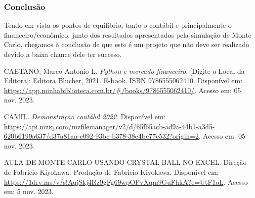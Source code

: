 \documentclass[11pt]{article}
\begin{document}
\subsubsection{\textbf{Conclusão}}
Tendo em vista os pontos de equilíbrio, tanto o contábil e principalmente o financeiro/econômico, junto dos resultados apresentados pela simulação de Monte Carlo, chegamos à conclusão de que este é um projeto que não deve ser realizado devido a baixa chance dele ter sucesso.

\newpage
\begin{thebibliography}{9}

CAETANO, Marco Antonio L. 
\textit{Python e mercado financeiro}. 
[Digite o Local da Editora]: Editora Blucher, 2021. E-book. ISBN 9786555062410. 
Disponível em: \href{https://app.minhabiblioteca.com.br/#/books/9786555062410/}{https://app.minhabiblioteca.com.br/#/books/9786555062410/}. 
Acesso em: 05 nov. 2023.

CAMIL. 
\textit{Demonstração contábil 2022}. 
Disponível em: \href{https://api.mziq.com/mzfilemanager/v2/d/65f65acb-ad9a-44b1-a3d5-620b6199a637/d37a81aa-c092-93bc-b378-38e4bc77c532?origin=2}{https://api.mziq.com/mzfilemanager/v2/d/65f65acb-ad9a-44b1-a3d5-620b6199a637/d37a81aa-c092-93bc-b378-38e4bc77c532?origin=2}. 
Acesso em: 05 nov. 2023.

AULA DE MONTE CARLO USANDO CRYSTAL BALL NO EXCEL. 
Direção de Fabricio Kiyokawa. Produção de Fabricio Kiyokawa.
Disponível em: \href{https://1drv.ms/v/s!AqjSkj4Rz9gFg69wpOPvXqm9GuFhkA?e=UtF1oL}{https://1drv.ms/v/s!AqjSkj4Rz9gFg69wpOPvXqm9GuFhkA?e=UtF1oL}. 
Acesso em: 5 nov. 2023.

\end{thebibliography}
\end{document}
